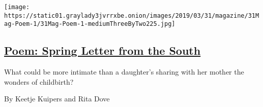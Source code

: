 \begin{enumerate}
  \texttt{[image: https://static01.graylady3jvrrxbe.onion/images/2019/03/31/magazine/31Mag-Poem-1/31Mag-Poem-1-mediumThreeByTwo225.jpg]}

  \hypertarget{poem-spring-letter-from-the-south}{%
  \subsection{\texorpdfstring{\href{/2019/03/28/magazine/poem-spring-letter-from-the-south.html}{Poem:
  Spring Letter from the
  South}}{Poem: Spring Letter from the South}}\label{poem-spring-letter-from-the-south}}

  What could be more intimate than a daughter's sharing with her mother
  the wonders of childbirth?

  By Keetje Kuipers and Rita Dove
\end{enumerate}


